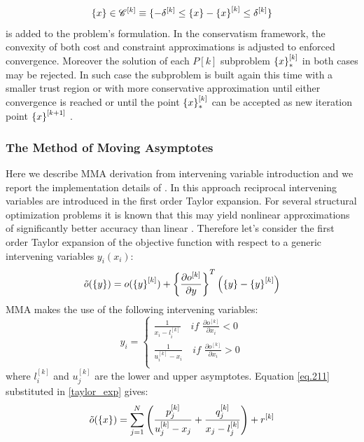 \begin{equation}
\left\lbrace{x}\right \rbrace\in \mathscr{C}^{[k]}\equiv \lbrace -\delta^{[k]} \leq \left\lbrace{x}\right \rbrace-\left\lbrace{x}\right \rbrace^{[k]}\leq \delta^{[k]} \rbrace
\end{equation}
is added to the problem's formulation.
In the conservatism framework, the convexity of both cost and constraint approximations is adjusted to enforced convergence. Moreover the solution of each $P[k]$ subproblem $\left\lbrace{x}\right \rbrace^{[k]}_*$ in both cases may be rejected. In such case the subproblem is built again this time with a smaller trust region or with more conservative approximation until either convergence is reached or until the point  $\left\lbrace{x}\right \rbrace^{[k]}_*$ can be accepted as new iteration point $\left\lbrace{x}\right \rbrace^{[k+1]}$ \cite{svanberg2002class}.
 \subsubsection{The Method of Moving Asymptotes}
 Here we describe MMA derivation from intervening variable introduction and we report the implementation details of \cite{svanberg2007mma}.
 In this approach reciprocal intervening variables are introduced in the first order Taylor expansion. For several structural optimization problems it is known that this may yield nonlinear approximations of significantly better accuracy than linear \cite{etman2012first}. Therefore let’s consider the first order Taylor expansion of the objective function with respect to a generic intervening variables $y_i(x_i)$:
 \begin{equation}
 \label{taylor_exp}
\tilde{o}(\left\lbrace{y}\right \rbrace)=o(\left\lbrace{y}\right \rbrace^{[k]})+\left\lbrace{\frac{\partial o^{[k]}}{\partial y}}\right \rbrace^T\left(\left\lbrace{y}\right \rbrace-\left\lbrace{y}\right \rbrace^{[k]}\right)
 \end{equation}
MMA makes the use of the following intervening variables:
\begin{equation}
\label{eq.211}
y_i=
\begin{cases}
\frac{1}{x_i-l_i^{[k]}} \quad \textit{if } \frac{\partial o^{[k]}}{\partial x_i}<0\\
\frac{1}{u_i^{[k]}-x_i} \quad \textit{if } \frac{\partial o^{[k]}}{\partial x_i}>0\\
\end{cases}
\end{equation}
where $l_i^{[k]}$ and $u_j^{[k]}$ are the lower and upper asymptotes. 
Equation \eqref{eq.211} substituted in \eqref{taylor_exp} gives:
\begin{equation}
\tilde{o}(\left\lbrace{x}\right \rbrace)=\sum_{j=1}^N\left(\frac{p_j^{[k]}}{u_j^{[k]}-x_j}+\frac{q_j^{[k]}}{x_j-l_j^{[k]}}\right)+r^{[k]}
\end{equation}
